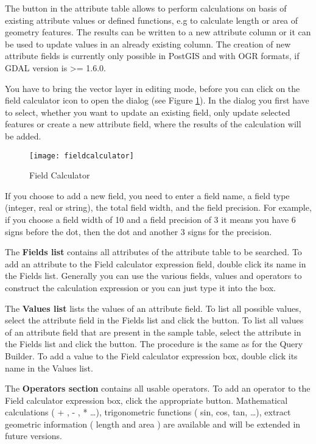 The  button in the 
attribute table allows to perform calculations on basis of existing 
attribute values or defined functions, e.g to calculate length or area 
of geometry features. The results can be written to a new attribute column 
or it can be used to update values in an already existing column. The creation 
of new attribute fields is currently only possible in PostGIS and with OGR 
formats, if GDAL version is >= 1.6.0. 

You have to bring the vector layer in editing mode, before you can click on 
the field calculator icon to open the dialog (see Figure 
\ref{fig:field_calculator}). In the dialog you first have to select, whether 
you want to update an existing field, only update selected features or 
create a new attribute field, where the results of the calculation will be added. 

\begin{figure}[ht]
  \centering
    \texttt{[image: fieldcalculator]}
    \caption{Field Calculator \nixcaption}\label{fig:field_calculator}
\end{figure}

If you choose to add a new field, you need to enter a field name, a field type 
(integer, real or string), the total field width, and the field precision. 
For example, if you choose a field width of 10 and a field precision of 3 it 
means you have 6 signs before the dot, then the dot and another 3 signs for the 
precision.   

The \textbf{Fields list} contains all attributes of the attribute table to be
searched. To add an attribute to the Field calculator expression field, double 
click its name in the Fields list. Generally you can use the various fields, 
values and operators to construct the calculation expression or you can just 
type it into the box.

The \textbf{Values list} lists the values of an attribute field. To list all 
possible values, select the attribute field in the Fields list and click the
 button. To list all 
values of an attribute field that are present in the sample table, select the 
attribute in the Fields list and click the  button. The procedure is the same as for the Query 
Builder. To add a value to the Field calculator expression box, double click its 
name in the Values list.

The \textbf{Operators section} contains all usable operators. To add an operator
to the Field calculator expression box, click the appropriate button. Mathematical 
calculations ( + , - , * \dots), trigonometric functions ( sin, cos, tan, \dots), 
extract geometric information ( length and area ) are available and will be 
extended in future versions.

